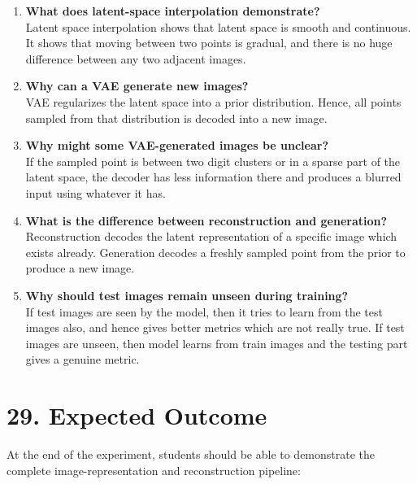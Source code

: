\documentclass[10pt]{article}
\begin{document}
\begin{enumerate}
\item \textbf{What does latent-space interpolation demonstrate?}\\
Latent space interpolation shows that latent space is smooth and continuous. It shows that moving between two points is gradual, and there is no huge difference between any two adjacent images.\\

\item \textbf{Why can a VAE generate new images?}\\
VAE regularizes the latent space into a prior distribution. Hence, all points sampled from that distribution is decoded into a new image.\\

\item \textbf{Why might some VAE-generated images be unclear?}\\
If the sampled point is between two digit clusters or in a sparse part of the latent space, the decoder has less information there and produces a blurred input using whatever it has.\\

\item \textbf{What is the difference between reconstruction and generation?}\\
Reconstruction decodes the latent representation of a specific image which exists already. Generation decodes a freshly sampled point from the prior to produce a new image.\\

\item \textbf{Why should test images remain unseen during training?}\\
If test images are seen by the model, then it tries to learn from the test images also, and hence gives better metrics which are not really true. If test images are unseen, then model learns from train images and the testing part gives a genuine metric.\\

\end{enumerate}

\section*{29. Expected Outcome}

At the end of the experiment, students should be able to demonstrate the
complete image-representation and reconstruction pipeline:
\end{document}
